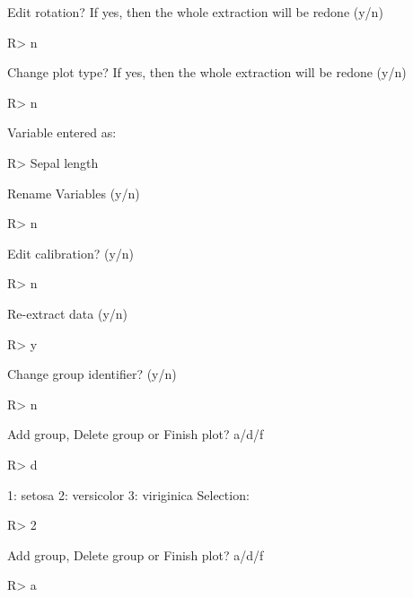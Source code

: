 \documentclass[article]{jss}
\begin{document}
\begin{CodeChunk}

\begin{CodeOutput}
Edit rotation? If yes, then the whole extraction will be redone (y/n) 
\end{CodeOutput}
\begin{CodeInput}
R> n
\end{CodeInput}
\begin{CodeOutput}
Change plot type? If yes, then the whole extraction will be redone (y/n) 
\end{CodeOutput}
\begin{CodeInput}
R> n
\end{CodeInput}
\begin{CodeOutput}
Variable entered as: 
\end{CodeOutput}
\begin{CodeInput}
R> Sepal length
\end{CodeInput}
\begin{CodeOutput}
Rename Variables (y/n) 
\end{CodeOutput}
\begin{CodeInput}
R> n
\end{CodeInput}
\begin{CodeOutput}
Edit calibration? (y/n) 
\end{CodeOutput}
\begin{CodeInput}
R> n
\end{CodeInput}
\begin{CodeOutput}
Re-extract data (y/n) 
\end{CodeOutput}
\begin{CodeInput}
R> y
\end{CodeInput}
\begin{CodeOutput}
Change group identifier? (y/n) 
\end{CodeOutput}
\begin{CodeInput}
R> n
\end{CodeInput}
\begin{CodeOutput}
Add group, Delete group or Finish plot? a/d/f 
\end{CodeOutput}
\begin{CodeInput}
R> d
\end{CodeInput}
\begin{CodeOutput}
1: setosa
2: versicolor
3: viriginica
Selection: 
\end{CodeOutput}
\begin{CodeInput}
R> 2
\end{CodeInput}
\begin{CodeOutput}
Add group, Delete group or Finish plot? a/d/f 
\end{CodeOutput}
\begin{CodeInput}
R> a
\end{CodeInput}

\end{CodeChunk}
\end{document}
